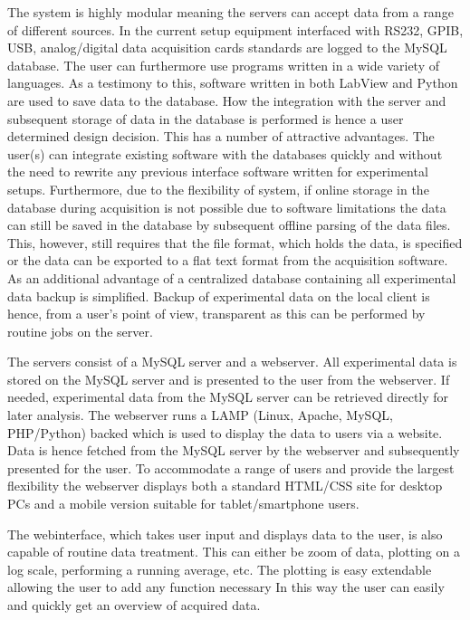 The system is highly modular meaning the servers can accept data from a range
of different sources. In the current setup equipment interfaced with RS232,
GPIB, USB, analog/digital data acquisition cards standards are logged to the
MySQL database. The user can furthermore use programs written in a wide variety
of languages. As a testimony to this, software written in both LabView and
Python are used to save data to the database. How the integration with the
server and subsequent storage of data in the database is performed is hence a
user determined design decision. This has a number of attractive advantages.
The user(s) can integrate existing software with the databases quickly and
without the need to rewrite any previous interface software written for
experimental setups. Furthermore, due to the flexibility of system, if online
storage in the database during acquisition is not possible due to software
limitations the data can still be saved in the database by subsequent offline
parsing of the data files. This, however, still requires that the file format,
which holds the data, is specified or the data can be exported to a flat text
format from the acquisition software. As an additional advantage of a
centralized database containing all experimental data backup is simplified.
Backup of experimental data on the local client is hence, from a user's point
of view, transparent as this can be performed by routine jobs on the server.

The servers consist of a MySQL server and a webserver. All experimental data is
stored on the MySQL server and is presented to the user from the webserver. If
needed, experimental data from the MySQL server can be retrieved directly for
later analysis. The webserver runs a LAMP (Linux, Apache, MySQL,
PHP/Python) backed which is used to display the data to users via
a website. Data is hence fetched from the MySQL server by the webserver and
subsequently presented for the user. To accommodate a range of users and
provide the largest flexibility the webserver displays both a standard HTML/CSS
site for desktop PCs and a mobile version suitable for tablet/smartphone users.

The webinterface, which takes user input and displays data to the user, is
also capable of routine data treatment. This can either be zoom of data,
plotting on a log scale, performing a running average, etc. The plotting is
easy extendable allowing the user to add any function necessary  In this way
the user can easily and quickly get an overview of acquired data.
